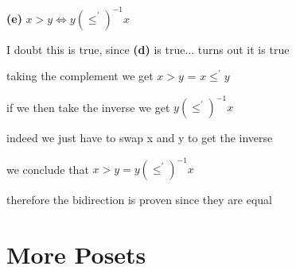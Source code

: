 \documentclass[12pts,A4]{article}
\begin{document}
\begin{flushleft}
    \bigskip

\textbf{(e)} $ x > y \iff y (\leq^{'})^{-1} x $ 
    
    I doubt this is true, since \textbf{(d)} is true...
    turns out it is true


    
    taking the complement we get  $ x > y$ = $ x \leq ^{'} y $
   
    if we then take the inverse we get $ y (\leq ^{'} )^{-1} x $
    
    indeed we just have to swap x and y to get the inverse
    
    \bigskip

    we conclude that $ x > y =  y (\leq^{'})^{-1} x $  

    therefore the bidirection is proven since they are equal


\end{flushleft}
\section {More Posets}
\end{document}
